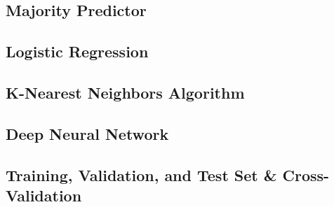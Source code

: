 \subsection{Majority Predictor}

\subsection{Logistic Regression}

\subsection{K-Nearest Neighbors Algorithm}

\subsection{Deep Neural Network}

\subsection{Training, Validation, and Test Set \& Cross-Validation}

\clearpage